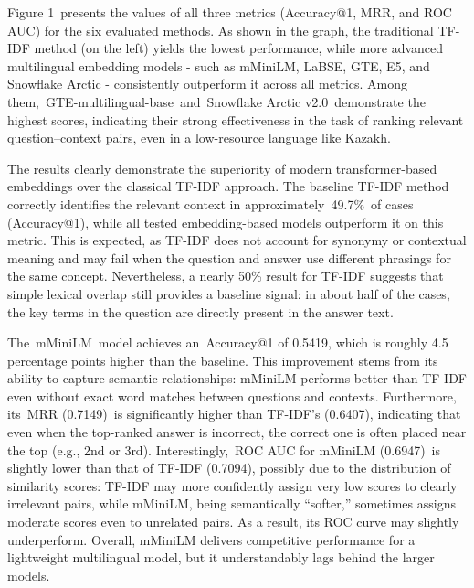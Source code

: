 \begin{multicols}{2}
Figure 1~presents the values of all three metrics (Accuracy@1, MRR, and
ROC AUC) for the six evaluated methods. As shown in the graph, the
traditional TF-IDF method (on the left) yields the lowest performance,
while more advanced multilingual embedding models - such as mMiniLM,
LaBSE, GTE, E5, and Snowflake Arctic - consistently outperform it across
all metrics. Among them,~GTE-multilingual-base~and~Snowflake Arctic
v2.0~demonstrate the highest scores, indicating their strong
effectiveness in the task of ranking relevant question--context pairs,
even in a low-resource language like Kazakh.

The results clearly demonstrate the superiority of modern
transformer-based embeddings over the classical TF-IDF approach. The
baseline TF-IDF method correctly identifies the relevant context in
approximately~49.7\%~of cases (Accuracy@1), while all tested
embedding-based models outperform it on this metric. This is expected,
as TF-IDF does not account for synonymy or contextual meaning and may
fail when the question and answer use different phrasings for the same
concept. Nevertheless, a nearly 50\% result for TF-IDF suggests that
simple lexical overlap still provides a baseline signal: in about half
of the cases, the key terms in the question are directly present in the
answer text.

The~mMiniLM~model achieves an~Accuracy@1 of 0.5419, which is roughly 4.5
percentage points higher than the baseline. This improvement stems from
its ability to capture semantic relationships: mMiniLM performs better
than TF-IDF even without exact word matches between questions and
contexts. Furthermore, its~MRR (0.7149)~is significantly higher than
TF-IDF's (0.6407), indicating that even when the top-ranked answer is
incorrect, the correct one is often placed near the top (e.g., 2nd or
3rd). Interestingly,~ROC AUC for mMiniLM (0.6947)~is slightly lower than
that of TF-IDF (0.7094), possibly due to the distribution of similarity
scores: TF-IDF may more confidently assign very low scores to clearly
irrelevant pairs, while mMiniLM, being semantically ``softer,''
sometimes assigns moderate scores even to unrelated pairs. As a result,
its ROC curve may slightly underperform. Overall, mMiniLM delivers
competitive performance for a lightweight multilingual model, but it
understandably lags behind the larger models.
\end{multicols}



